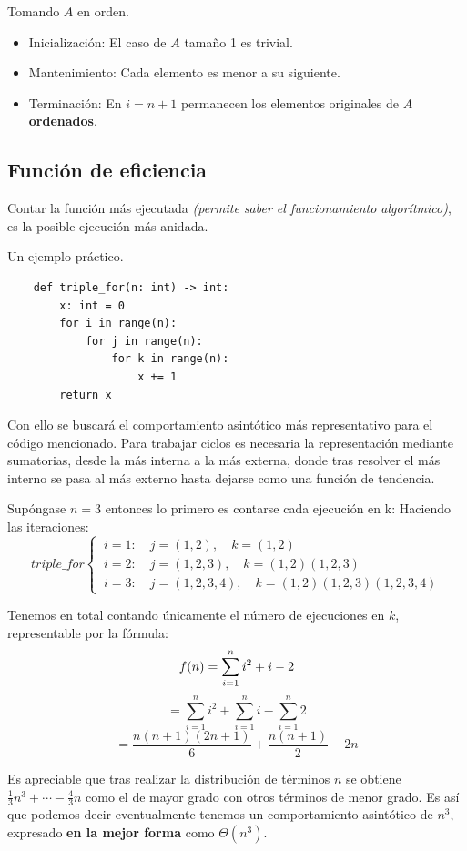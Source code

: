 \begin{example}
	Tomando $A$ en orden.
	\begin{itemize}
		\item Inicialización: El caso de $A$ tamaño 1 es trivial.
		\item Mantenimiento: Cada elemento es menor a su siguiente.
		\item Terminación: En $i=n+1$ permanecen los elementos originales de $A$ \textbf{ordenados}.
	\end{itemize}
\end{example}

\subsection{Función de eficiencia}

Contar la función más ejecutada \textit{(permite saber el funcionamiento algorítmico)}, es la posible ejecución más anidada.


\begin{example}
	Un ejemplo práctico.

	\begin{lstlisting}
    def triple_for(n: int) -> int:
        x: int = 0
        for i in range(n):
            for j in range(n):
                for k in range(n):
                    x += 1
        return x
    \end{lstlisting}

	Con ello se buscará el comportamiento asintótico más representativo para el código mencionado.
	Para trabajar ciclos es necesaria la representación mediante sumatorias, desde la más interna a la más externa, donde tras resolver el más interno se pasa al más
	externo hasta dejarse como una función de tendencia.

	Supóngase $n=3$ entonces lo primero es contarse cada ejecución en k:
	Haciendo las iteraciones:
	$$triple\_for\begin{cases}
			~i=1:\quad j=(1,2),\quad k=(1,2)          \\
			~i=2:\quad j=(1,2,3),\quad k=(1,2)(1,2,3) \\
			~i=3:\quad j=(1,2,3,4),\quad k=(1,2)(1,2,3)(1,2,3,4)
		\end{cases}$$

	\begin{remark}
		Tenemos en total contando únicamente el número de ejecuciones en $k$, representable por la fórmula:
		$$
			f(n)=\sum_{i=1}^n i^2+i-2 \\
		$$ $$
			=\sum_{i=1}^n i^2 + \sum_{i=1}^n i - \sum_{i=1}^n 2
		$$ $$
			=\frac{n(n+1)(2n+1)}6+\frac{n(n+1)}2-2n
		$$
	\end{remark}
	Es apreciable que tras realizar la distribución de términos $n$ se obtiene $\frac13n^3+\cdots-\frac43n$ como el de mayor grado con otros términos de menor grado. Es así que podemos decir eventualmente tenemos un comportamiento asintótico de $n^3$, expresado \textbf{en la mejor forma} como $\Theta(n^3)$.
\end{example}

